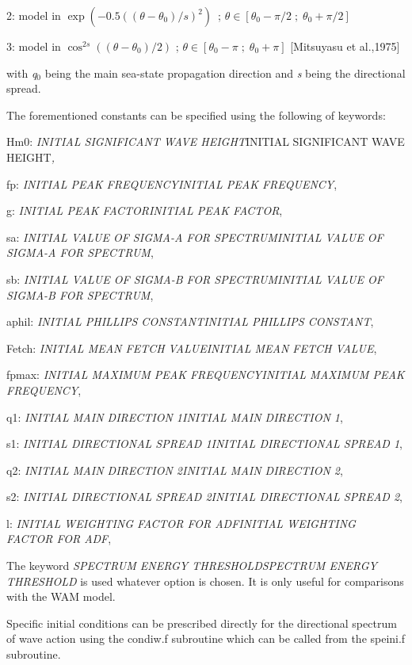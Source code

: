 2:  model in $\exp \left(-0.5\left(\left(\theta -\theta _{0} \right)/s\right)^{2} \right)$~; $\theta \in \left[\theta _{0} -\pi /2\; ;\; \theta _{0} +\pi /2\right]$

 3:  model in $\cos ^{2s} \left(\left(\theta -\theta _{0} \right)/2\right)$ ; $\theta \in \left[\theta _{0} -\pi \; ;\; \theta _{0} +\pi \right]$ [Mitsuyasu et al.,1975]

 with \textit{q${}_{0}$} being the main sea-state propagation direction and \textit{s} being the directional spread.



 The forementioned constants can be specified using the following of keywords:

 Hm0: \textit{INITIAL SIGNIFICANT WAVE HEIGHT}INITIAL SIGNIFICANT WAVE HEIGHT\textit{,}

 fp:  \textit{INITIAL PEAK FREQUENCYINITIAL PEAK FREQUENCY},

 g:  \textit{INITIAL PEAK FACTORINITIAL PEAK FACTOR},

 sa:  \textit{INITIAL VALUE OF SIGMA-A FOR SPECTRUMINITIAL VALUE OF SIGMA-A FOR SPECTRUM},

 sb:  \textit{INITIAL VALUE OF SIGMA-B FOR SPECTRUMINITIAL VALUE OF SIGMA-B FOR SPECTRUM},

 aphil:  \textit{INITIAL PHILLIPS CONSTANTINITIAL PHILLIPS CONSTANT},

 Fetch:  \textit{INITIAL MEAN FETCH VALUEINITIAL MEAN FETCH VALUE},

 fpmax:  \textit{INITIAL MAXIMUM PEAK FREQUENCYINITIAL MAXIMUM PEAK FREQUENCY},

 q1:  \textit{INITIAL MAIN DIRECTION 1INITIAL MAIN DIRECTION 1},

 s1:  \textit{INITIAL DIRECTIONAL SPREAD 1INITIAL DIRECTIONAL SPREAD 1},

 q2:  \textit{INITIAL MAIN DIRECTION 2INITIAL MAIN DIRECTION 2},

 s2:  \textit{INITIAL DIRECTIONAL SPREAD 2INITIAL DIRECTIONAL SPREAD 2},

 l:  \textit{INITIAL WEIGHTING FACTOR FOR ADFINITIAL WEIGHTING FACTOR FOR ADF},



 The keyword \textit{SPECTRUM ENERGY THRESHOLDSPECTRUM ENERGY THRESHOLD} is used whatever option is chosen. It is only useful for comparisons with the WAM model.

 Specific initial conditions can be prescribed directly for the directional spectrum of wave action using the condiw.f subroutine which can be called from the speini.f subroutine.



